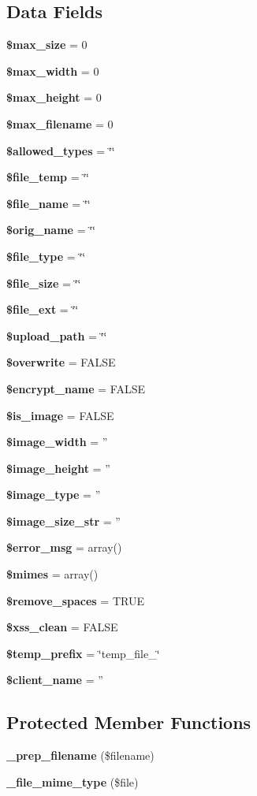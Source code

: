 \subsection*{Data Fields}
\begin{DoxyCompactItemize}
\item 
{\bf \$max\-\_\-size} = 0
\item 
{\bf \$max\-\_\-width} = 0
\item 
{\bf \$max\-\_\-height} = 0
\item 
{\bf \$max\-\_\-filename} = 0
\item 
{\bf \$allowed\-\_\-types} = \char`\"{}\char`\"{}
\item 
{\bf \$file\-\_\-temp} = \char`\"{}\char`\"{}
\item 
{\bf \$file\-\_\-name} = \char`\"{}\char`\"{}
\item 
{\bf \$orig\-\_\-name} = \char`\"{}\char`\"{}
\item 
{\bf \$file\-\_\-type} = \char`\"{}\char`\"{}
\item 
{\bf \$file\-\_\-size} = \char`\"{}\char`\"{}
\item 
{\bf \$file\-\_\-ext} = \char`\"{}\char`\"{}
\item 
{\bf \$upload\-\_\-path} = \char`\"{}\char`\"{}
\item 
{\bf \$overwrite} = F\-A\-L\-S\-E
\item 
{\bf \$encrypt\-\_\-name} = F\-A\-L\-S\-E
\item 
{\bf \$is\-\_\-image} = F\-A\-L\-S\-E
\item 
{\bf \$image\-\_\-width} = ''
\item 
{\bf \$image\-\_\-height} = ''
\item 
{\bf \$image\-\_\-type} = ''
\item 
{\bf \$image\-\_\-size\-\_\-str} = ''
\item 
{\bf \$error\-\_\-msg} = array()
\item 
{\bf \$mimes} = array()
\item 
{\bf \$remove\-\_\-spaces} = T\-R\-U\-E
\item 
{\bf \$xss\-\_\-clean} = F\-A\-L\-S\-E
\item 
{\bf \$temp\-\_\-prefix} = \char`\"{}temp\-\_\-file\-\_\-\char`\"{}
\item 
{\bf \$client\-\_\-name} = ''
\end{DoxyCompactItemize}
\subsection*{Protected Member Functions}
\begin{DoxyCompactItemize}
\item 
{\bf \-\_\-prep\-\_\-filename} (\$filename)
\item 
{\bf \-\_\-file\-\_\-mime\-\_\-type} (\$file)
\end{DoxyCompactItemize}
